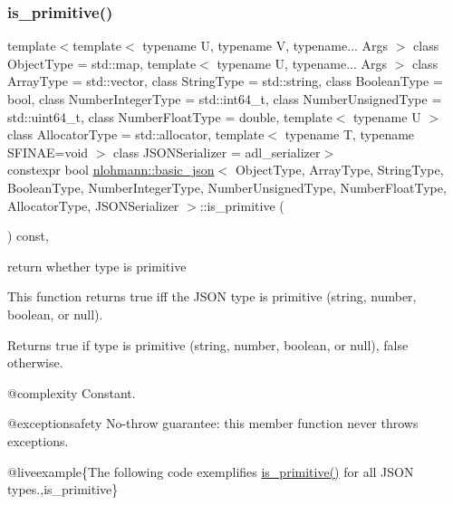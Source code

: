 \subsubsection{\texorpdfstring{is\_primitive()}{is\_primitive()}}
{\footnotesize\ttfamily template$<$template$<$ typename U, typename V, typename... Args $>$ class Object\+Type = std\+::map, template$<$ typename U, typename... Args $>$ class Array\+Type = std\+::vector, class String\+Type  = std\+::string, class Boolean\+Type  = bool, class Number\+Integer\+Type  = std\+::int64\+\_\+t, class Number\+Unsigned\+Type  = std\+::uint64\+\_\+t, class Number\+Float\+Type  = double, template$<$ typename U $>$ class Allocator\+Type = std\+::allocator, template$<$ typename T, typename S\+F\+I\+N\+A\+E=void $>$ class J\+S\+O\+N\+Serializer = adl\+\_\+serializer$>$ \\
constexpr bool \mbox{\hyperlink{classnlohmann_1_1basic__json}{nlohmann\+::basic\+\_\+json}}$<$ Object\+Type, Array\+Type, String\+Type, Boolean\+Type, Number\+Integer\+Type, Number\+Unsigned\+Type, Number\+Float\+Type, Allocator\+Type, J\+S\+O\+N\+Serializer $>$\+::is\+\_\+primitive (\begin{DoxyParamCaption}{ }\end{DoxyParamCaption}) const\hspace{0.3cm}{\ttfamily [inline]}, {\ttfamily [noexcept]}}



return whether type is primitive 

This function returns true iff the J\+S\+ON type is primitive (string, number, boolean, or null).

\begin{DoxyReturn}{Returns}
{\ttfamily true} if type is primitive (string, number, boolean, or null), {\ttfamily false} otherwise.
\end{DoxyReturn}
@complexity Constant.

@exceptionsafety No-\/throw guarantee\+: this member function never throws exceptions.

@liveexample\{The following code exemplifies {\ttfamily \mbox{\hyperlink{classnlohmann_1_1basic__json_a6362b88718eb5c6d4fed6a61eed44b95}{is\+\_\+primitive()}}} for all J\+S\+ON types.,is\+\_\+primitive\}

